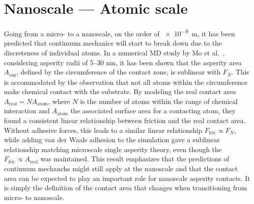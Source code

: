 









%
\section{Nanoscale --- Atomic scale}\label{sec:nanoscale}
Going from a micro- to a nanoscale, on the order of \SI{e-9}{m}, it has been
predicted that continuum mechanics will start to break down
\cite{luan_breakdown_2005} due to the discreteness of individual atoms. In a
numerical \acrshort{MD} study by Mo et al.~\cite{mo_friction_2009}, considering
asperity radii of 5--30 nm, it has been shown that the asperity area
$A_{\text{asp}}$, defined by the circumference of the contact zone, is
sublinear with $F_N$. This is accommodated by the observation that not all atoms
within the circumference make chemical contact with the substrate. By modeling
the real contact area $A_{\text{real}} = NA_{\text{atom}}$, where $N$ is the
number of atoms within the range of chemical interaction and $A_{\text{atom}}$
the associated surface area for a contacting atom, they found a consistent linear relationship between friction and the real contact area. Without adhesive
forces, this leads to a similar linear relationship $F_{\text{fric}} \propto F_N$,
while adding van der Waals adhesion to the simulation gave a sublinear
relationship matching microscale single asperity theory, even though the
$F_{\text{fric}} \propto A_{\text{real}}$ was maintained. This result emphasizes
that the predictions of continuum mechanchs might still apply at the nanoscale
and that the contact area can be expected to play an important role for
nanoscale asperity contacts. It is simply the definition of the contact area that
changes when transitioning from micro- to nanoscale. 


